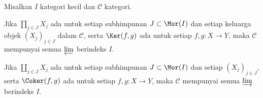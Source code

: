 \begin{theorem}\label{prop:limit-buildingblocks}
	Misalkan $I$ kategori kecil dan $\mathcal{C}$ kategori.
	\begin{compactenum}
		\item Jika $\prod_{j \in J} X_j$ ada untuk setiap subhimpunan $J \subset \Mor(I)$ dan setiap keluarga objek $(X_j)_{j \in J}$ dalam $\mathcal{C}$, serta $\Ker(f,g)$ ada untuk setiap $f, g: X \to Y$, maka $\mathcal{C}$ mempunyai semua $\varprojlim$ berindeks $I$.
		\item Jika $\coprod_{j \in J} X_j$ ada untuk setiap subhimpunan $J \subset \Mor(I)$ dan setiap $(X_j)_{j \in J}$, serta $\Coker(f,g)$ ada untuk setiap $f, g: X \to Y$, maka $\mathcal{C}$ mempunyai semua $\varinjlim$ berindeks $I$.
	\end{compactenum}
\end{theorem}
